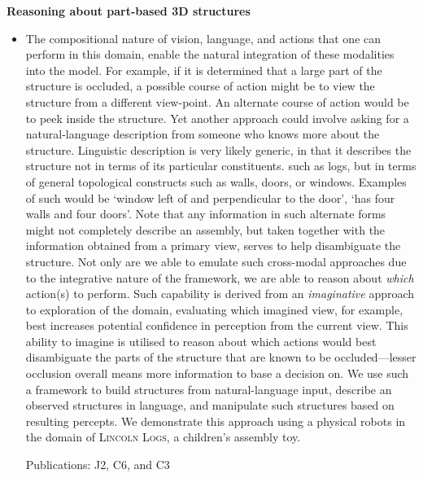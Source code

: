 \documentclass[10pt]{article}
\newenvironment{researchBlock}[1]{%
  \vspace*{0.5ex}
  {\noindent\large \textbf{#1}}
  \begin{itemize}\item}
  {\end{itemize}\vspace{3ex}}
\newcommand{\refr}[1]{{\color{RoyalBlue} #1}}
\newcommand{\LincolnLogs}{\textsc{Lincoln Logs}}
\begin{document}
\begin{researchBlock} {Reasoning about part-based 3D structures}
  The compositional nature of vision, language, and actions that one can
  perform in this domain, enable the natural integration of these modalities
  into the model.
  For example, if it is determined that a large part of the structure is
  occluded, a possible course of action might be to view the structure from a
  different view-point.
  An alternate course of action would be to peek inside the structure.
  Yet another approach could involve asking for a natural-language description
  from someone who knows more about the structure.
  Linguistic description is very likely generic, in that it describes the
  structure not in terms of its particular constituents. such as logs, but in
  terms of general topological constructs such as walls, doors, or windows.
  Examples of such would be `window left of and perpendicular to the door',
  `has four walls and four doors'.
  Note that any information in such alternate forms might not completely
  describe an assembly, but taken together with the information obtained from a
  primary view, serves to help disambiguate the structure.
  Not only are we able to emulate such cross-modal approaches due to the
  integrative nature of the framework, we are able to reason about \emph{which}
  action(s) to perform.
  Such capability is derived from an \emph{imaginative} approach to exploration
  of the domain, evaluating which imagined view, for example, best increases
  potential confidence in perception from the current view.
  This ability to imagine is utilised to reason about which actions would best
  disambiguate the parts of the structure that are known to be occluded---lesser
  occlusion overall means more information to base a decision on.
  We use such a framework to build structures from natural-language input,
  describe an observed structures in language, and manipulate such structures
  based on resulting percepts. We demonstrate this approach using a physical
  robots in the domain of \LincolnLogs, a children's assembly toy.

  \vspace{2ex}
  Publications: \refr{J2}, \refr{C6}, and \refr{C3}
\end{researchBlock}
\end{document}

